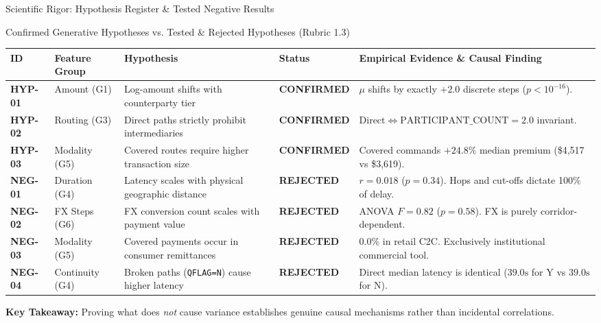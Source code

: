 \documentclass[aspectratio=169, 10pt]{beamer}
\begin{document}
\begin{frame}{Scientific Rigor: Hypothesis Register \& Tested Negative Results}
\footnotesize
\begin{block}{Confirmed Generative Hypotheses vs. Tested \& Rejected Hypotheses (Rubric 1.3)}
\begin{tabular}{@{}llllp{5.5cm}@{}}
\toprule
\textbf{ID} & \textbf{Feature Group} & \textbf{Hypothesis} & \textbf{Status} & \textbf{Empirical Evidence \& Causal Finding} \\ \midrule
\textbf{HYP-01} & Amount (G1) & Log-amount shifts with counterparty tier & \textbf{CONFIRMED} & $\mu$ shifts by exactly $+2.0$ discrete steps ($p < 10^{-16}$). \\
\textbf{HYP-02} & Routing (G3) & Direct paths strictly prohibit intermediaries & \textbf{CONFIRMED} & $\text{Direct} \iff \text{PARTICIPANT\_COUNT} = 2.0$ invariant. \\
\textbf{HYP-03} & Modality (G5) & Covered routes require higher transaction size & \textbf{CONFIRMED} & Covered commands $+24.8\%$ median premium (\$4,517 vs \$3,619). \\ \midrule
\textbf{NEG-01} & Duration (G4) & Latency scales with physical geographic distance & \textbf{REJECTED} & $r=0.018$ ($p=0.34$). Hops and cut-offs dictate 100\% of delay. \\
\textbf{NEG-02} & FX Steps (G6) & FX conversion count scales with payment value & \textbf{REJECTED} & ANOVA $F=0.82$ ($p=0.58$). FX is purely corridor-dependent. \\
\textbf{NEG-03} & Modality (G5) & Covered payments occur in consumer remittances & \textbf{REJECTED} & 0.0\% in retail C2C. Exclusively institutional commercial tool. \\
\textbf{NEG-04} & Continuity (G4)& Broken paths (\texttt{QFLAG=N}) cause higher latency & \textbf{REJECTED} & Direct median latency is identical ($39.0\text{s}$ for Y vs $39.0\text{s}$ for N). \\ \bottomrule
\end{tabular}
\end{block}
\vspace{-0.2cm}
\begin{center}
  \scriptsize \textbf{Key Takeaway:} Proving what does \emph{not} cause variance establishes genuine causal mechanisms rather than incidental correlations.
\end{center}
\end{frame}
\end{document}
